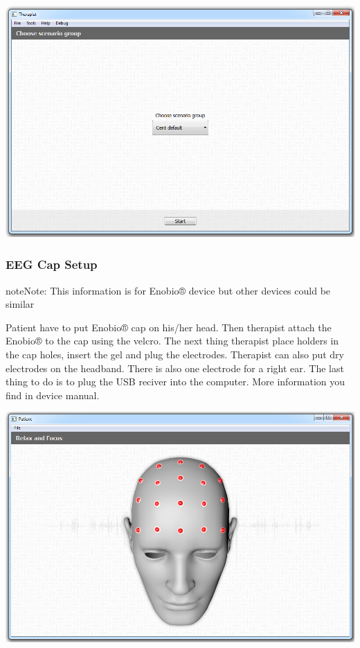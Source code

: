 \documentclass[letterpaper,10pt,english]{sphinxmanual}
\begin{document}
{\hfill\includegraphics{ScenarioGroup.PNG}\hfill}


\subsubsection{EEG Cap Setup}
\label{index:eeg-cap-setup}
\begin{notice}{note}{Note:}
This information is for Enobio® device but other devices could be similar
\end{notice}

Patient have to put Enobio® cap on his/her head. Then therapist attach the Enobio® to the cap using the velcro. The next thing therapist place holders in the cap holes, insert the gel and plug the electrodes. Therapist can also put dry electrodes on the headband. There is also one electrode for a right ear. The last thing to do is to plug the USB reciver into the computer. More information you find in device manual.

{\hfill\includegraphics{PlaceElectrodes.PNG}\hfill}
\end{document}
